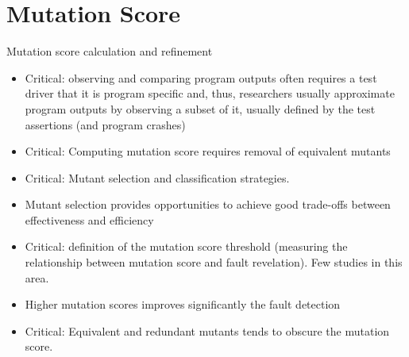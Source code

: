 
\section{Mutation Score}\label{sec:mutationscore}

Mutation score calculation and refinement
\begin{itemize}
	\item Critical: observing and comparing program outputs often requires a test driver that it is program specific and, thus, researchers usually approximate program outputs by observing a subset of it, usually defined by the test assertions (and program crashes)
	\item Critical: Computing mutation score requires removal of equivalent mutants
	\item Critical: Mutant selection and classification strategies.
	\item Mutant selection provides opportunities to achieve good trade-offs between effectiveness and efficiency
	\item Critical: definition of the mutation score threshold (measuring the relationship between mutation score and fault revelation). Few studies in this area.
	\item Higher mutation scores improves significantly the fault detection
	\item Critical: Equivalent and redundant mutants tends to obscure the mutation score.
\end{itemize}
